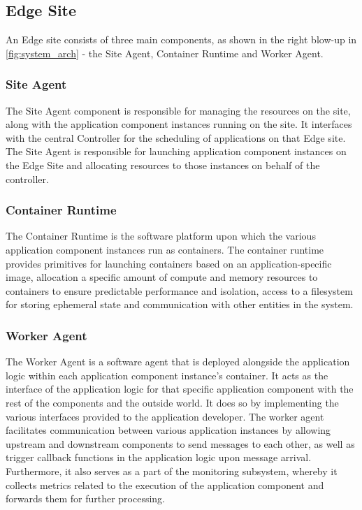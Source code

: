 \subsection{Edge Site}
An Edge site consists of three main components, as shown in the right blow-up in \cref{fig:system_arch} - the Site Agent, Container Runtime and Worker Agent.%
\subsubsection{Site Agent}
The Site Agent component is responsible for managing the resources on the site, along with the application component instances running on the site. It interfaces with the central Controller for the scheduling of applications on that Edge site. The Site Agent is responsible for launching application component instances on the Edge Site and allocating resources to those instances on behalf of the controller.

\subsubsection{Container Runtime}
The Container Runtime is the software platform upon which the various application component instances run as containers. The container runtime provides primitives for launching containers based on an application-specific image, allocation a specific amount of compute and memory resources to containers to ensure predictable performance and isolation, access to a filesystem for storing ephemeral state and communication with other entities in the system. 

\subsubsection{Worker Agent}
The Worker Agent is a software agent that is deployed alongside the application logic within each application component instance's container. It acts as the interface of the application logic for that specific application component with the rest of the components and the outside world. It does so by implementing the various interfaces provided to the application developer. The worker agent facilitates communication between various application instances by allowing upstream and downstream components to send messages to each other, as well as trigger callback functions in the application logic upon message arrival. Furthermore, it also serves as a part of the monitoring subsystem, whereby it collects metrics related to the execution of the application component and forwards them for further processing.

